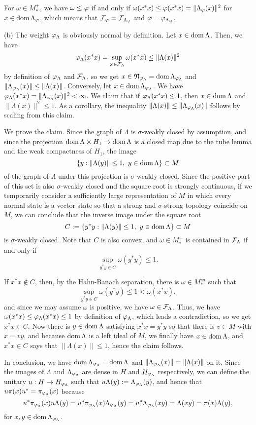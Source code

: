 \documentclass{../../large}
\begin{document}
\begin{pf}
For $\omega\in M_*^+$, we have $\omega\le\varphi$ if and only if $\omega(x^*x)\le\varphi(x^*x)=\|\Lambda_\varphi(x)\|^2$ for $x\in\operatorname{dom}\Lambda_\varphi$, which means that $\mathcal{F}_\varphi=\mathcal{F}_{\Lambda_\varphi}$ and $\varphi=\varphi_{\Lambda_\varphi}$.

(b)
The weight $\varphi_\Lambda$ is obviously normal by definition.
Let $x\in\operatorname{dom}\Lambda$.
Then, we have
\[\varphi_\Lambda(x^*x)=\sup_{\omega\in\mathcal{F}_\Lambda}\omega(x^*x)\le\|\Lambda(x)\|^2\]
by definition of $\varphi_\Lambda$ and $\mathcal{F}_\Lambda$, so we get $x\in\mathfrak{N}_{\varphi_\Lambda}=\operatorname{dom}\Lambda_{\varphi_\Lambda}$ and $\|\Lambda_{\varphi_\Lambda}(x)\|\le\|\Lambda(x)\|$.
Conversely, let $x\in\operatorname{dom}\Lambda_{\varphi_\Lambda}$.
We have $\varphi_\Lambda(x^*x)=\|\Lambda_{\varphi_\Lambda}(x)\|^2<\infty$.
We claim that if $\varphi_\Lambda(x^*x)\le1$, then $x\in\operatorname{dom}\Lambda$ and $\|\Lambda(x)\|^2\le1$.
As a corollary, the inequality $\|\Lambda(x)\|\le\|\Lambda_{\varphi_\Lambda}(x)\|$ follows by scaling from this claim.

We prove the claim.
Since the graph of $\Lambda$ is $\sigma$-weakly closed by assumption, and since the projection $\operatorname{dom}\Lambda\times H_1\to\operatorname{dom}\Lambda$ is a closed map due to the tube lemma and the weak compactness of $H_1$, the image
\[\{y:\|\Lambda(y)\|\le1,\ y\in\dom\Lambda\}\subset M\]
of the graph of $\Lambda$ under this projection is $\sigma$-weakly closed.
Since the positive part of this set is also $\sigma$-weakly closed and the square root is strongly continuous, if we temporarily consider a sufficiently large representation of $M$ in which every normal state is a vector state so that a strong and $\sigma$-strong topology coincide on $M$, we can conclude that the inverse image under the square root
\[C:=\{y^*y:\|\Lambda(y)\|\le1,\ y\in\dom\Lambda\}\subset M\]
is $\sigma$-weakly closed.
Note that $C$ is also convex, and $\omega\in M_*^+$ is contained in $\mathcal{F}_\Lambda$ if and only if
\[\sup_{y^*y\in C}\omega(y^*y)\le1.\]

If $x^*x\notin C$, then, by the Hahn-Banach separation, there is $\omega\in M_*^{sa}$ such that
\[\sup_{y^*y\in C}\omega(y^*y)\le1<\omega(x^*x),\]
and since we may assume $\omega$ is positive, we have $\omega\in\mathcal{F}_\Lambda$.
Thus, we have $\omega(x^*x)\le\varphi_\Lambda(x^*x)\le1$ by definition of $\varphi_\Lambda$, which leads a contradiction, so we get $x^*x\in C$.
Now there is $y\in\operatorname{dom}\Lambda$ satisfying $x^*x=y^*y$ so that there is $v\in M$ with $x=vy$, and because $\operatorname{dom}\Lambda$ is a left ideal of $M$, we finally have $x\in\operatorname{dom}\Lambda$, and $x^*x\in C$ says that $\|\Lambda(x)\|\le1$, hence the claim follows.

In conclusion, we have $\operatorname{dom}\Lambda_{\varphi_\Lambda}=\operatorname{dom}\Lambda$ and $\|\Lambda_{\varphi_\Lambda}(x)\|=\|\Lambda(x)\|$ on it.
Since the images of $\Lambda$ and $\Lambda_{\varphi_\Lambda}$ are dense in $H$ and $H_{\varphi_\Lambda}$ respectively, we can define the unitary $u:H\to H_{\varphi_\Lambda}$ such that $u\Lambda(y):=\Lambda_{\varphi_\Lambda}(y)$, and hence that $u\pi(x)u^*=\pi_{\varphi_\Lambda}(x)$ because
\[u^*\pi_{\varphi_\Lambda}(x)u\Lambda(y)=u^*\pi_{\varphi_\Lambda}(x)\Lambda_{\varphi_\Lambda}(y)=u^*\Lambda_{\varphi_\Lambda}(xy)=\Lambda(xy)=\pi(x)\Lambda(y),\]
for $x,y\in\operatorname{dom}\Lambda_{\varphi_\Lambda}$.
\end{pf}
\end{document}
